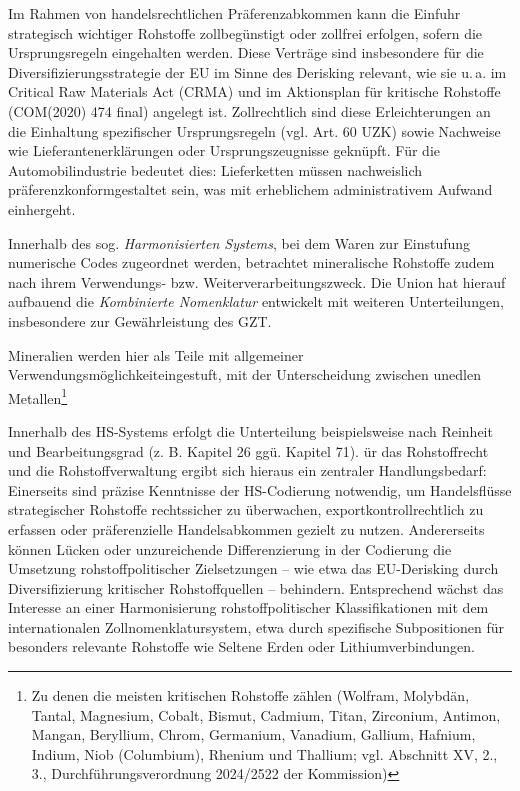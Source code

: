 \documentclass[12pt,a4paper,oneside]{book} %
\begin{document}
{%

Im Rahmen von handelsrechtlichen Präferenzabkommen kann die Einfuhr strategisch wichtiger Rohstoffe zollbegünstigt oder zollfrei erfolgen, sofern die Ursprungsregeln eingehalten werden. Diese Verträge sind insbesondere für die Diversifizierungsstrategie der EU im Sinne des Derisking relevant, wie sie u. a. im Critical Raw Materials Act (CRMA) und im Aktionsplan für kritische Rohstoffe (COM(2020) 474 final) angelegt ist. Zollrechtlich sind diese Erleichterungen an die Einhaltung spezifischer Ursprungsregeln (vgl. Art. 60 UZK) sowie Nachweise wie Lieferantenerklärungen oder Ursprungszeugnisse geknüpft. Für die Automobilindustrie bedeutet dies: Lieferketten müssen nachweislich \glqq präferenzkonform\grqq gestaltet sein, was mit erheblichem administrativem Aufwand einhergeht.

Innerhalb des sog. \textit{Harmonisierten Systems}, bei dem Waren zur Einstufung numerische Codes zugeordnet werden, betrachtet mineralische Rohstoffe zudem nach ihrem Verwendungs- bzw. Weiterverarbeitungszweck. Die Union hat hierauf aufbauend die \textit{Kombinierte Nomenklatur} entwickelt mit weiteren Unterteilungen, insbesondere zur Gewährleistung des GZT. 



Mineralien werden hier als \glqq Teile mit allgemeiner Verwendungsmöglichkeit\grqq eingestuft, mit der Unterscheidung zwischen \glqq unedlen Metallen\grqq\footnote{Zu denen die meisten kritischen Rohstoffe zählen (Wolfram, Molybdän, Tantal, Magnesium, Cobalt, Bismut, Cadmium, Titan, Zirconium, Antimon, Mangan, Beryllium, Chrom, Germanium, Vanadium, Gallium, Hafnium, Indium, Niob (Columbium), Rhenium und Thallium; vgl. Abschnitt XV, 2., 3., Durchführungsverordnung 2024/2522 der Kommission)}

Innerhalb des HS-Systems erfolgt die Unterteilung beispielsweise nach Reinheit und Bearbeitungsgrad (z. B. Kapitel 26 ggü. Kapitel 71). ür das Rohstoffrecht und die Rohstoffverwaltung ergibt sich hieraus ein zentraler Handlungsbedarf: Einerseits sind präzise Kenntnisse der HS-Codierung notwendig, um Handelsflüsse strategischer Rohstoffe rechtssicher zu überwachen, exportkontrollrechtlich zu erfassen oder präferenzielle Handelsabkommen gezielt zu nutzen. Andererseits können Lücken oder unzureichende Differenzierung in der Codierung die Umsetzung rohstoffpolitischer Zielsetzungen – wie etwa das EU-Derisking durch Diversifizierung kritischer Rohstoffquellen – behindern. Entsprechend wächst das Interesse an einer Harmonisierung rohstoffpolitischer Klassifikationen mit dem internationalen Zollnomenklatursystem, etwa durch spezifische Subpositionen für besonders relevante Rohstoffe wie Seltene Erden oder Lithiumverbindungen.

}
\end{document}
